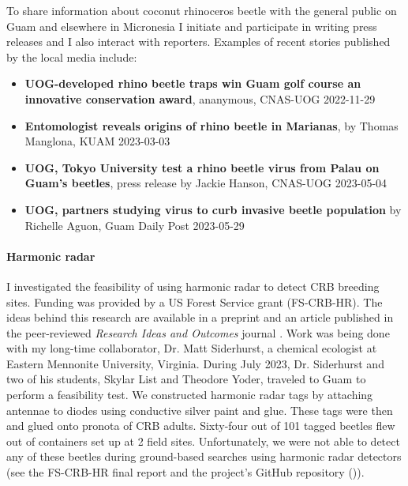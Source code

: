 \begin{refsection}
To share information about coconut rhinoceros beetle with the general public on Guam and elsewhere in Micronesia I initiate and participate in writing press releases and I also interact with reporters. Examples of recent stories published by the local media include:

\begin{itemize}
	
\item \textbf{UOG-developed rhino beetle traps win Guam golf course an innovative conservation award}, ananymous, CNAS-UOG 2022-11-29 \cite{anonymousUOGdevelopedRhinoBeetle2022}
	
\item \textbf{Entomologist reveals origins of rhino beetle in Marianas}, by Thomas Manglona, KUAM 2023-03-03 \cite{manglonaEntomologistRevealsOrigins2023}

\item \textbf{UOG, Tokyo University test a rhino beetle virus from Palau on Guam’s beetles}, press release by Jackie Hanson, CNAS-UOG 2023-05-04 \cite{hansonUOGTokyoUniversity2023}

\item \textbf{UOG, partners studying virus to curb invasive beetle population} by Richelle Aguon, Guam Daily Post 2023-05-29 \cite{postUOGPartnersStudying2023}

\end{itemize}

\paragraph{Harmonic radar}

I investigated the feasibility of using harmonic radar to detect CRB breeding sites. Funding was provided by a US Forest Service grant (FS-CRB-HR). The ideas behind this research are available in a preprint \cite{moore_detecting_2022} and an article published in the peer-reviewed \textit{Research Ideas and Outcomes} journal \cite{mooreProposalDetectingCoconut2022}. Work was being done with my long-time collaborator, Dr. Matt Siderhurst, a chemical ecologist at Eastern Mennonite University, Virginia. During July 2023, Dr. Siderhurst and two of his students, Skylar List and Theodore Yoder, traveled to Guam to perform a feasibility test. We constructed harmonic radar tags by attaching antennae to diodes using conductive silver paint and glue. These tags were then and glued onto pronota of CRB adults. Sixty-four out of 101 tagged beetles flew out of containers set up at 2 field sites. Unfortunately, we were not able to detect any of these beetles during ground-based searches using harmonic radar detectors (see the FS-CRB-HR final report \cite{mooreImprovingCoconutRhinoceros2023} and the project's GitHub repository (\cite{mooreGitHubRepositoryHarmonicRadar2021})). 


\end{refsection}
